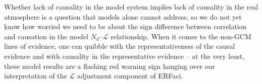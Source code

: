 \documentclass[acp, manuscript]{copernicus}\usepackage[]{graphicx}\usepackage[]{xcolor}
\newcommand{\jmu}{\ensuremath{j_\mu}}
\newcommand{\jmcomment}[1]{\todo[inline, color=red!50]{\jmu: #1}}
\newcommand\nd{\ensuremath{N_d}}
\newcommand\lwp{\ensuremath{\mathcal L}}
\begin{document}

Whether lack of causality in the model system implies lack of causality in the
real atmosphere is a question that models alone cannot address, so we do not yet
know how worried we need to be about the sign difference between correlation and
causation in the model \nd--\lwp{} relationship.  When it comes to the non-GCM
lines of evidence, one can quibble with the representativeness of the causal
evidence and with causality in the representative evidence -- at the very
least, these model results are a flashing red warning sign hanging over our
interpretation of the \lwp{} adjustment component of ERFaci.












\end{document}
